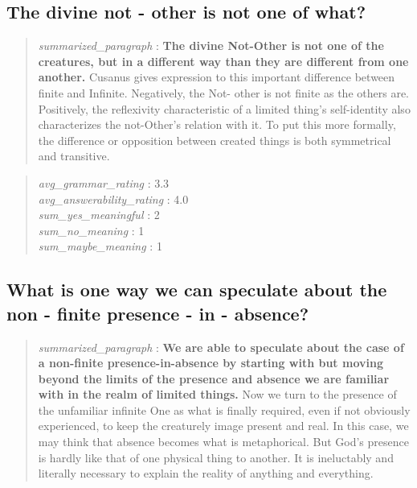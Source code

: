 \hypertarget{the-divine-not---other-is-not-one-of-what}{%
\subsection{The divine not - other is not one of
what?}\label{the-divine-not---other-is-not-one-of-what}}

\begin{quote}
\emph{summarized\_paragraph} : \textbf{The divine Not-Other is not one
of the creatures, but in a different way than they are different from
one another.} Cusanus gives expression to this important difference
between finite and Infinite. Negatively, the Not- other is not finite as
the others are. Positively, the reflexivity characteristic of a limited
thing's self-identity also characterizes the not-Other's relation with
it. To put this more formally, the difference or opposition between
created things is both symmetrical and transitive.
\end{quote}

\begin{quote}
\emph{avg\_grammar\_rating} : 3.3\\
\emph{avg\_answerability\_rating} : 4.0\\
\emph{sum\_yes\_meaningful} : 2\\
\emph{sum\_no\_meaning} : 1\\
\emph{sum\_maybe\_meaning} : 1
\end{quote}

\hypertarget{what-is-one-way-we-can-speculate-about-the-non---finite-presence---in---absence}{%
\subsection{What is one way we can speculate about the non - finite
presence - in -
absence?}\label{what-is-one-way-we-can-speculate-about-the-non---finite-presence---in---absence}}

\begin{quote}
\emph{summarized\_paragraph} : \textbf{We are able to speculate about
the case of a non-finite presence-in-absence by starting with but moving
beyond the limits of the presence and absence we are familiar with in
the realm of limited things.} Now we turn to the presence of the
unfamiliar infinite One as what is finally required, even if not
obviously experienced, to keep the creaturely image present and real. In
this case, we may think that absence becomes what is metaphorical. But
God's presence is hardly like that of one physical thing to another. It
is ineluctably and literally necessary to explain the reality of
anything and everything.
\end{quote}

